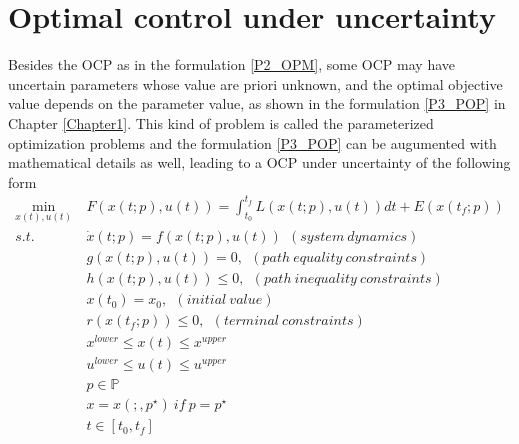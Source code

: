 \documentclass  [
  paper    = a4,
  BCOR     = 10mm,
  twoside,
  fontsize = 12pt,
  fleqn,
  toc      = bibnumbered,
  toc      = listofnumbered,
  numbers  = noendperiod,
  headings = normal,
  listof   = leveldown,
  version  = 3.03
]                                       {scrreprt}
\newcommand{\<}{\langle}
\renewcommand{\>}{\rangle}
\begin{document}
\chapter{Optimal control under uncertainty}
\label{Chapter3}
Besides the OCP as in the formulation \ref{P2_OPM}, some OCP may have uncertain parameters whose value are priori unknown, and the optimal objective value depends on the parameter value, as shown in the formulation \ref{P3_POP} in Chapter \ref{Chapter1}. This kind of problem is called the parameterized optimization problems and the  formulation \ref{P3_POP}  can be augumented with mathematical details as well, leading to a OCP under uncertainty of the following form
	\begin{subequations}
	\begin{align}
		\underset{x(t), u(t)}{\text{min}}   \ &  F(x(t;p), u(t))  = \int_{t_0}^{t_f}L(x(t;p), u(t))dt + E (x(t_f;p)) \label{P4_cost} \\
		s.t.\ \ &  \dot{x} (t;p) = f(x(t;p), u(t)) \ \ (system \ dynamics)   \label{P4_sd} \\
		& g(x(t;p), u(t)) = 0, \ \  (path\  equality\  constraints)  \label{P4_ec}\\
		& h(x(t;p), u(t)) \leq 0, \ \ (path\  inequality \ constraints)  \label{P4_inc}\\
		& x(t_0) = x_0, \ \ (initial \ value) \\
		& r(x(t_f; p)) \leq 0, \ \ (terminal \ constraints)  \label{P4_final} \\
		& x^{lower} \leq x(t) \leq x^{upper}   \label{P4_box_x} \\ 
		& u^{lower} \leq u(t) \leq u^{upper}   \label{P4_box_u} \\ 
		& p  \in   \mathbb{P}  \\
		& x = x(;,p^\star) \ if \ p = p^\star \\
		& t \in [t_0, t_f]
	\end{align}
	\label{P4_OCPPara}
\end{subequations}  
\end{document}

